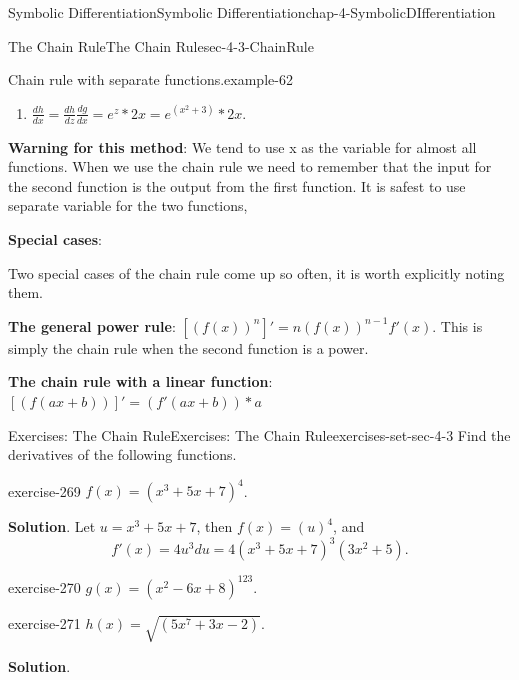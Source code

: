 \documentclass[oneside,10pt,]{book}
\newcommand{\terminology}[1]{\textbf{#1}}
\numberwithin{equation}{section}
\begin{document}
\begin{chapterptx}{Symbolic Differentiation}{}{Symbolic Differentiation}{}{}{chap-4-SymbolicDIfferentiation}
\begin{sectionptx}{The Chain Rule}{}{The Chain Rule}{}{}{sec-4-3-ChainRule}
\begin{example}{Chain rule with separate functions.}{example-62}
\begin{enumerate}[label=(\alph*)]
\item\hypertarget{li-508}{}\(\frac{dh}{dx}=\frac{dh}{dz}\frac{dg}{dx}
=e^z*2x=e^{(x^2+3)}*2x.\)%
\end{enumerate}
\end{example}
\hypertarget{p-1655}{}%
\terminology{Warning for this method}:  We tend to use x as the variable for almost all functions.  When we use the chain rule we need to remember that the input for the second function is the output from the first function.  It is safest to use separate variable for the two functions,%
\par
\hypertarget{p-1656}{}%
\terminology{Special cases}:%
\par
\hypertarget{p-1657}{}%
Two special cases of the chain rule come up so often, it is worth explicitly noting them.%
\par
\hypertarget{p-1658}{}%
\terminology{The general power rule}: \([(f(x))^n ]'=n (f(x))^{n-1} f'(x)\).  This is simply the chain rule when the second function is a power.%
\par
\hypertarget{p-1659}{}%
\terminology{The chain rule with a linear function}:  \([(f(a x+b))]'=(f'(a x+b))*a\)%
%
%
\typeout{************************************************}
\typeout{************************************************}
%
\begin{exercises-subsection-numberless}{Exercises: The Chain Rule}{}{Exercises: The Chain Rule}{}{}{exercises-set-sec-4-3}
\hypertarget{p-1660}{}%
Find the derivatives of the following functions.%
\begin{divisionexercise}{1}{}{}{exercise-269}%
\hypertarget{p-1661}{}%
\(f(x)=(x^3+5 x+7)^4\).%
\par\smallskip%
\noindent\textbf{Solution}.\hypertarget{solution-134}{}\quad%
\hypertarget{p-1662}{}%
Let \(u=x^3+5 x+7\), then \(f(x)=(u)^4\), and%
%
\begin{equation*}
f'(x)=4u^3 du=4(x^3+5 x+7)^3  (3x^2+5).
\end{equation*}
\end{divisionexercise}%
\begin{divisionexercise}{2}{}{}{exercise-270}%
\hypertarget{p-1663}{}%
\(g(x)=(x^2-6x+8)^{123}\).%
\end{divisionexercise}%
\begin{divisionexercise}{3}{}{}{exercise-271}%
\hypertarget{p-1664}{}%
\(h(x)=\sqrt{(5x^7+3x-2)}\).%
\par\smallskip%
\noindent\textbf{Solution}.\hypertarget{solution-135}{}\quad%

\end{divisionexercise}
\end{exercises-subsection-numberless}
\end{sectionptx}
\end{chapterptx}
\end{document}
